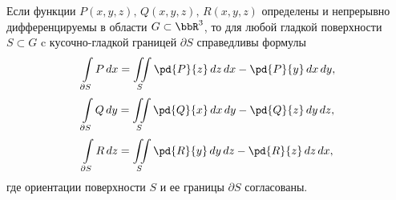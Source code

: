 \begin{thm}
Если функции $P(x,y,z),\, Q(x,y,z),\, R(x,y,z)$ определены и непрерывно дифференцируемы в области $G\subset \bbR^3$, то для любой гладкой поверхности $S\subset G$ c кусочно-гладкой границей $\partial S$ справедливы формулы
\begin{equation} \label{yaa14e2}
\int\limits_{\partial S} P\,dx = \iint\limits_{S} \pd{P}{z}\,dz\,dx-\pd{P}{y}\,dx\,dy,
\end{equation}
\begin{equation} \label{yaa14e3}
\int\limits_{\partial S} Q\,dy = \iint\limits_{S} \pd{Q}{x}\,dx\,dy- \pd{Q}{z}\,dy\,dz,
\end{equation}
\begin{equation} \label{yaa14e4}
\int\limits_{\partial S} R\,dz =\iint\limits_{S} \pd{R}{y}\,dy\,dz- \pd{R}{z}\,dz\,dx,
\end{equation}
где ориентации поверхности $S$ и ее границы $\partial S$ согласованы.
\end{thm}
